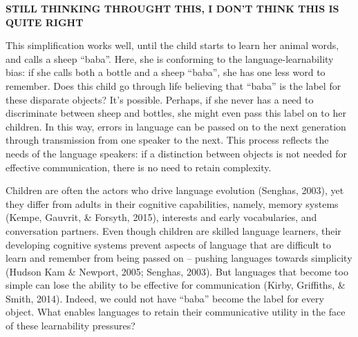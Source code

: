\documentclass[10pt, letterpaper]{article}
\begin{document}
\textbf{STILL THINKING THROUGHT THIS, I DON'T THINK THIS IS QUITE RIGHT}

This simplification works well, until the child starts to learn her
animal words, and calls a sheep ``baba''. Here, she is conforming to the
language-learnability bias: if she calls both a bottle and a sheep
``baba'', she has one less word to remember. Does this child go through
life believing that ``baba'' is the label for these disparate objects?
It's possible. Perhaps, if she never has a need to discriminate between
sheep and bottles, she might even pass this label on to her children. In
this way, errors in language can be passed on to the next generation
through transmission from one speaker to the next. This process reflects
the needs of the language speakers: if a distinction between objects is
not needed for effective communication, there is no need to retain
complexity.

Children are often the actors who drive language evolution (Senghas,
2003), yet they differ from adults in their cognitive capabilities,
namely, memory systems (Kempe, Gauvrit, \& Forsyth, 2015), interests and
early vocabularies, and conversation partners. Even though children are
skilled language learners, their developing cognitive systems prevent
aspects of language that are difficult to learn and remember from being
passed on -- pushing languages towards simplicity (Hudson Kam \&
Newport, 2005; Senghas, 2003). But languages that become too simple can
lose the ability to be effective for communication (Kirby, Griffiths, \&
Smith, 2014). Indeed, we could not have ``baba'' become the label for
every object. What enables languages to retain their communicative
utility in the face of these learnability pressures?
\end{document}
